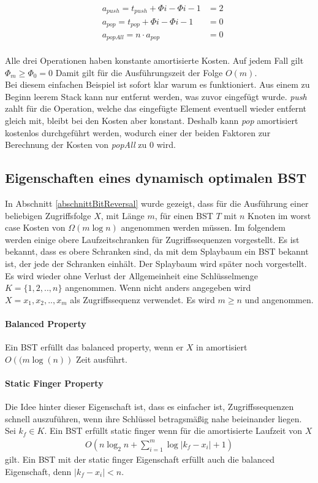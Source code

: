 \documentclass[a4paper,12pt]{article}
\begin{document}
\begin{align*}   
&a_{\mathit{push}} = t_{\mathit{push}} + \Phi{i} - \Phi{i-1}  &= 2\\
&a_{\mathit{pop}} = t_{\mathit{pop}} + \Phi{i} - \Phi{i-1}  &= 0\\
&a_{\mathit{popAll}} = n \cdot a_{\mathit{pop}} &= 0
\end{align*}\\
Alle drei Operationen haben konstante amortisierte Kosten. Auf jedem Fall gilt $ \Phi_m \geq  \Phi_0 = 0 $ Damit gilt für die Ausführungszeit der Folge $O(m)$. \\
Bei diesem einfachen Beispiel ist sofort klar warum es funktioniert. Aus einem zu Beginn leerem Stack kann nur entfernt werden, was zuvor eingefügt wurde. \textit{push} zahlt für die Operation, welche das eingefügte Element eventuell wieder entfernt gleich mit, bleibt bei den Kosten aber konstant. Deshalb kann \textit{pop} amortisiert kostenlos durchgeführt werden, wodurch einer der beiden Faktoren zur Berechnung der Kosten von \textit{popAll} zu $0$ wird. 


 
\subsection{Eigenschaften eines dynamisch optimalen BST }
In Abschnitt \ref{abschnittBitReversal} wurde gezeigt, dass für die Ausführung einer beliebigen Zugriffsfolge $X$, mit Länge $m$, für einen BST $T$ mit $n$ Knoten im worst case Kosten von  $\Omega\left(m \log n\right)$ angenommen werden müssen. Im folgendem werden einige obere Laufzeitschranken für Zugriffssequenzen vorgestellt. Es ist bekannt, dass es obere Schranken sind, da mit dem Splaybaum ein BST bekannt ist, der jede der Schranken einhält. Der Splaybaum wird später noch vorgestellt. Es wird wieder ohne Verlust der Allgemeinheit eine Schlüsselmenge $K = \{1,2,..,n\}$ angenommen. Wenn nicht anders angegeben wird  $X = x_1,x_2,..,x_m$ als Zugriffssequenz verwendet. Es wird $m \geq n$ und angenommen.


\paragraph{Balanced Property}
Ein BST erfüllt das balanced property, wenn er $X$ in amortisiert $O\left((m \log \left(n \right)\right)$ Zeit ausführt. 

\paragraph{Static Finger Property}
Die Idee hinter dieser Eigenschaft ist, dass es einfacher ist, Zugriffssequenzen schnell auszuführen, wenn ihre Schlüssel betragsmäßig nahe beieinander liegen. 
Sei $k_f \in K$. Ein BST erfüllt static finger wenn für die amortisierte Laufzeit von $X$ 
\begin{align*}
O\left(n \log_2 n + \sum_{i = 1}^{m} \log \vert k_f - x_i  \vert	+ 1	\right)
\end{align*}
gilt. Ein BST mit der static finger Eigenschaft erfüllt auch die balanced Eigenschaft, denn $ \vert k_f - x_i  \vert < n$.
\end{document}
